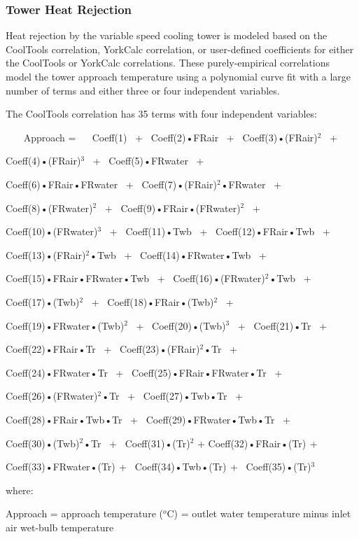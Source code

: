 \subsubsection{Tower Heat Rejection}\label{tower-heat-rejection}

Heat rejection by the variable speed cooling tower is modeled based on the CoolTools correlation, YorkCalc correlation, or user-defined coefficients for either the CoolTools or YorkCalc correlations. These purely-empirical correlations model the tower approach temperature using a polynomial curve fit with a large number of terms and either three or four independent variables.

The CoolTools correlation has 35 terms with four independent variables:

~~~ Approach = ~~ Coeff(1)~ +~ Coeff(2)•FRair~ +~ Coeff(3)•(FRair)\(^{2}\)~ +

Coeff(4)•(FRair)\(^{3}\)~ +~ Coeff(5)•FRwater~ +

Coeff(6)•FRair•FRwater~ +~ Coeff(7)•(FRair)\(^{2}\)•FRwater~ +

Coeff(8)•(FRwater)\(^{2}\)~ +~ Coeff(9)•FRair•(FRwater)\(^{2}\)~ +

Coeff(10)•(FRwater)\(^{3}\)~ +~ Coeff(11)•Twb~ +~ Coeff(12)•FRair•Twb~ +

Coeff(13)•(FRair)\(^{2}\)•Twb~ +~ Coeff(14)•FRwater•Twb~ +

Coeff(15)•FRair•FRwater•Twb~ +~ Coeff(16)•(FRwater)\(^{2}\)•Twb~ +

Coeff(17)•(Twb)\(^{2}\)~ +~ Coeff(18)•FRair•(Twb)\(^{2}\)~ +

Coeff(19)•FRwater•(Twb)\(^{2}\)~ +~ Coeff(20)•(Twb)\(^{3}\)~ +~ Coeff(21)•Tr~ +

Coeff(22)•FRair•Tr~ +~ Coeff(23)•(FRair)\(^{2}\)•Tr~ +

Coeff(24)•FRwater•Tr~ +~ Coeff(25)•FRair•FRwater•Tr~ +

Coeff(26)•(FRwater)\(^{2}\)•Tr~ +~ Coeff(27)•Twb•Tr~ +

Coeff(28)•FRair•Twb•Tr~ +~ Coeff(29)•FRwater•Twb•Tr~ +

Coeff(30)•(Twb)\(^{2}\)•Tr~ +~ Coeff(31)•(Tr)\(^{2}\) + Coeff(32)•FRair•(Tr)\(^{ }\) +

Coeff(33)•FRwater•(Tr)\(^{ }\) +~ Coeff(34)•Twb•(Tr)\(^{ }\) +~ Coeff(35)•(Tr)\(^{3}\)

where:

Approach = approach temperature (\(^{o}\)C) = outlet water temperature minus inlet air wet-bulb temperature

